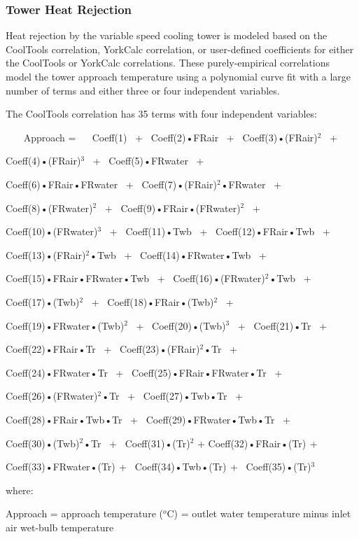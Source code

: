 \subsubsection{Tower Heat Rejection}\label{tower-heat-rejection}

Heat rejection by the variable speed cooling tower is modeled based on the CoolTools correlation, YorkCalc correlation, or user-defined coefficients for either the CoolTools or YorkCalc correlations. These purely-empirical correlations model the tower approach temperature using a polynomial curve fit with a large number of terms and either three or four independent variables.

The CoolTools correlation has 35 terms with four independent variables:

~~~ Approach = ~~ Coeff(1)~ +~ Coeff(2)•FRair~ +~ Coeff(3)•(FRair)\(^{2}\)~ +

Coeff(4)•(FRair)\(^{3}\)~ +~ Coeff(5)•FRwater~ +

Coeff(6)•FRair•FRwater~ +~ Coeff(7)•(FRair)\(^{2}\)•FRwater~ +

Coeff(8)•(FRwater)\(^{2}\)~ +~ Coeff(9)•FRair•(FRwater)\(^{2}\)~ +

Coeff(10)•(FRwater)\(^{3}\)~ +~ Coeff(11)•Twb~ +~ Coeff(12)•FRair•Twb~ +

Coeff(13)•(FRair)\(^{2}\)•Twb~ +~ Coeff(14)•FRwater•Twb~ +

Coeff(15)•FRair•FRwater•Twb~ +~ Coeff(16)•(FRwater)\(^{2}\)•Twb~ +

Coeff(17)•(Twb)\(^{2}\)~ +~ Coeff(18)•FRair•(Twb)\(^{2}\)~ +

Coeff(19)•FRwater•(Twb)\(^{2}\)~ +~ Coeff(20)•(Twb)\(^{3}\)~ +~ Coeff(21)•Tr~ +

Coeff(22)•FRair•Tr~ +~ Coeff(23)•(FRair)\(^{2}\)•Tr~ +

Coeff(24)•FRwater•Tr~ +~ Coeff(25)•FRair•FRwater•Tr~ +

Coeff(26)•(FRwater)\(^{2}\)•Tr~ +~ Coeff(27)•Twb•Tr~ +

Coeff(28)•FRair•Twb•Tr~ +~ Coeff(29)•FRwater•Twb•Tr~ +

Coeff(30)•(Twb)\(^{2}\)•Tr~ +~ Coeff(31)•(Tr)\(^{2}\) + Coeff(32)•FRair•(Tr)\(^{ }\) +

Coeff(33)•FRwater•(Tr)\(^{ }\) +~ Coeff(34)•Twb•(Tr)\(^{ }\) +~ Coeff(35)•(Tr)\(^{3}\)

where:

Approach = approach temperature (\(^{o}\)C) = outlet water temperature minus inlet air wet-bulb temperature

